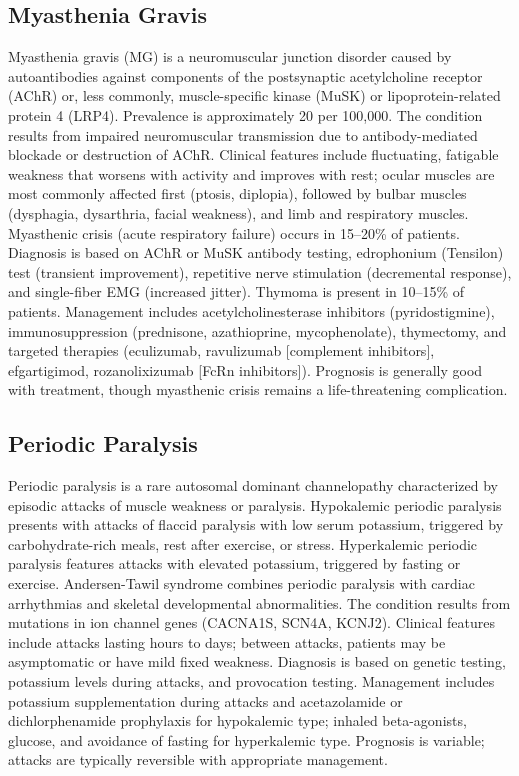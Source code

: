 \subsection{Myasthenia Gravis}
\label{sec:Myasthenia Gravis}
Myasthenia gravis (MG) is a neuromuscular junction disorder caused by autoantibodies against components of the postsynaptic acetylcholine receptor (AChR) or, less commonly, muscle-specific kinase (MuSK) or lipoprotein-related protein 4 (LRP4). Prevalence is approximately 20 per 100,000. The condition results from impaired neuromuscular transmission due to antibody-mediated blockade or destruction of AChR. Clinical features include fluctuating, fatigable weakness that worsens with activity and improves with rest; ocular muscles are most commonly affected first (ptosis, diplopia), followed by bulbar muscles (dysphagia, dysarthria, facial weakness), and limb and respiratory muscles. Myasthenic crisis (acute respiratory failure) occurs in 15--20\% of patients. Diagnosis is based on AChR or MuSK antibody testing, edrophonium (Tensilon) test (transient improvement), repetitive nerve stimulation (decremental response), and single-fiber EMG (increased jitter). Thymoma is present in 10--15\% of patients. Management includes acetylcholinesterase inhibitors (pyridostigmine), immunosuppression (prednisone, azathioprine, mycophenolate), thymectomy, and targeted therapies (eculizumab, ravulizumab [complement inhibitors], efgartigimod, rozanolixizumab [FcRn inhibitors]). Prognosis is generally good with treatment, though myasthenic crisis remains a life-threatening complication.

\subsection{Periodic Paralysis}
\label{sec:Periodic Paralysis}
Periodic paralysis is a rare autosomal dominant channelopathy characterized by episodic attacks of muscle weakness or paralysis. Hypokalemic periodic paralysis presents with attacks of flaccid paralysis with low serum potassium, triggered by carbohydrate-rich meals, rest after exercise, or stress. Hyperkalemic periodic paralysis features attacks with elevated potassium, triggered by fasting or exercise. Andersen-Tawil syndrome combines periodic paralysis with cardiac arrhythmias and skeletal developmental abnormalities. The condition results from mutations in ion channel genes (CACNA1S, SCN4A, KCNJ2). Clinical features include attacks lasting hours to days; between attacks, patients may be asymptomatic or have mild fixed weakness. Diagnosis is based on genetic testing, potassium levels during attacks, and provocation testing. Management includes potassium supplementation during attacks and acetazolamide or dichlorphenamide prophylaxis for hypokalemic type; inhaled beta-agonists, glucose, and avoidance of fasting for hyperkalemic type. Prognosis is variable; attacks are typically reversible with appropriate management.

